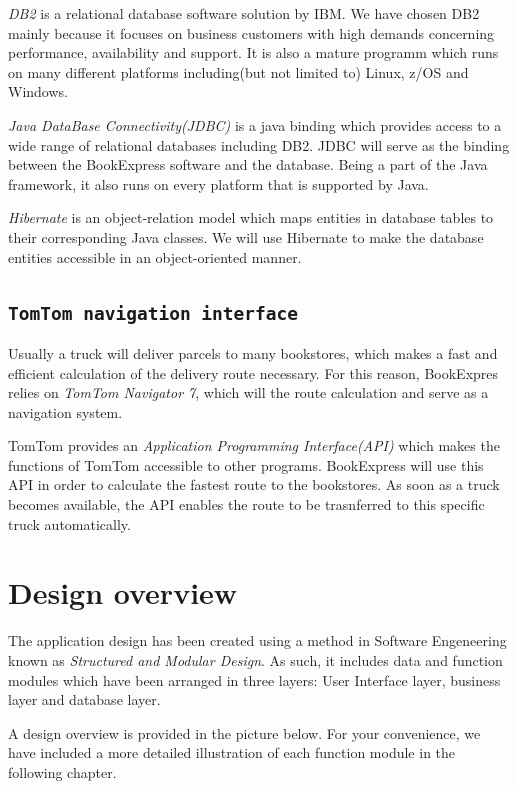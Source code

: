 \emph{DB2} is a relational database software solution by IBM. We have chosen DB2 mainly because it focuses on business customers with high demands concerning performance, availability and support. It is also a mature programm which runs on many different platforms including(but not limited to) Linux, z/OS and Windows.

\emph{Java DataBase Connectivity(JDBC)} is a java binding which provides access to a wide range of relational databases including DB2. JDBC will serve as the binding between the BookExpress software and the database. Being a part of the Java framework, it also runs on every platform that is supported by Java.

\emph{Hibernate} is an object-relation model which maps entities in database tables to their corresponding Java classes. We will use Hibernate to make the database entities accessible in an object-oriented manner.
\section{\texttt{TomTom navigation interface}}
Usually a truck will deliver parcels to many bookstores, which makes a fast and efficient calculation of the delivery route necessary. For this reason, BookExpres relies on \emph{TomTom Navigator 7}, which will the route calculation and serve as a navigation system.

TomTom provides an \emph{Application Programming Interface(API)} which makes the functions of TomTom accessible to other programs. BookExpress will use this API in order to calculate the fastest route to the bookstores. As soon as a truck becomes available, the API enables the route to be trasnferred to this specific truck automatically.
\chapter{Design overview}
The application design has been created using a method in Software Engeneering known as \emph{Structured and Modular Design}. As such, it includes data and function modules which have been arranged in three layers: User Interface layer, business layer and database layer.

A design overview is provided in the picture below. For your convenience, we have included a more detailed illustration of each function module in the following chapter.

